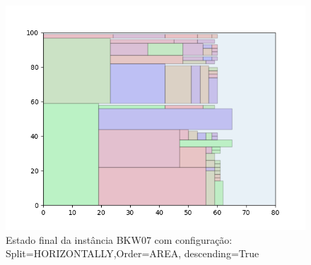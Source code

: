 \begin{figure}[H]
    \centering
    \caption[]{Estado final da instância BKW07 com configuração: Split=HORIZONTALLY,Order=AREA, descending=True}
    \label{fig:bkw07-horizontally-area-true}
    \includegraphics[scale=0.5]{output/figures/bkw/bkw07/horizontally/area/true/00}
\end{figure}